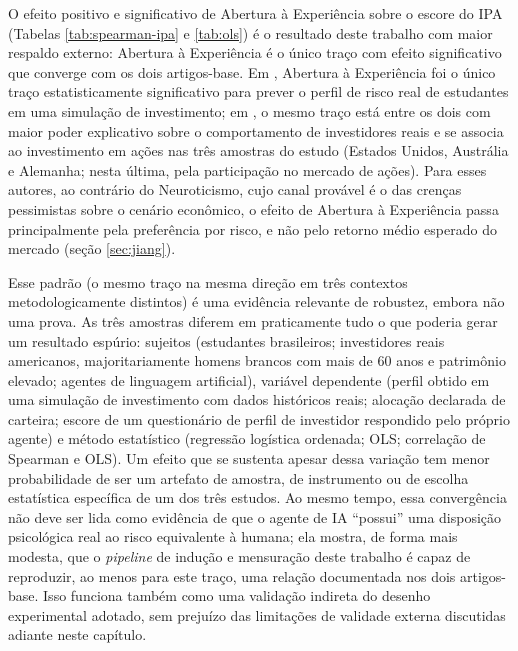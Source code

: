 O efeito positivo e significativo de Abertura à Experiência sobre o
escore do IPA (Tabelas \ref{tab:spearman-ipa} e \ref{tab:ols}) é o
resultado deste trabalho com maior respaldo externo: Abertura à
Experiência é o único traço com efeito significativo que converge com os
dois artigos-base. Em , Abertura à Experiência
foi o único traço estatisticamente significativo para prever o perfil de
risco real de estudantes em uma simulação de investimento; em
, o mesmo traço está entre os dois com maior
poder explicativo sobre o comportamento de investidores reais e se
associa ao investimento em ações nas três amostras do estudo (Estados
Unidos, Austrália e Alemanha; nesta última, pela participação no mercado
de ações). Para esses autores, ao contrário do Neuroticismo, cujo canal
provável é o das crenças pessimistas sobre o cenário econômico, o efeito
de Abertura à Experiência passa principalmente pela preferência por
risco, e não pelo retorno médio esperado do mercado (seção
\ref{sec:jiang}).

Esse padrão (o mesmo traço na mesma direção em três contextos
metodologicamente distintos) é uma evidência relevante de robustez,
embora não uma prova. As três amostras diferem em praticamente tudo o que
poderia gerar um resultado espúrio: sujeitos (estudantes brasileiros;
investidores reais americanos, majoritariamente homens brancos com mais
de 60 anos e patrimônio elevado; agentes de linguagem artificial),
variável dependente (perfil obtido em uma simulação de investimento com
dados históricos reais; alocação declarada de carteira; escore de um
questionário de perfil de investidor respondido pelo próprio agente) e
método estatístico (regressão logística ordenada; OLS; correlação de
Spearman e OLS). Um efeito que se sustenta apesar dessa variação tem
menor probabilidade de ser um artefato de amostra, de instrumento ou de
escolha estatística específica de um dos três estudos. Ao mesmo tempo,
essa convergência não deve ser lida como evidência de que o agente de IA
``possui'' uma disposição psicológica real ao risco equivalente à
humana; ela mostra, de forma mais modesta, que o \textit{pipeline} de
indução e mensuração deste trabalho é capaz de reproduzir, ao menos para
este traço, uma relação documentada nos dois artigos-base. Isso funciona
também como uma validação indireta do desenho experimental adotado, sem
prejuízo das limitações de validade externa discutidas adiante neste
capítulo.

